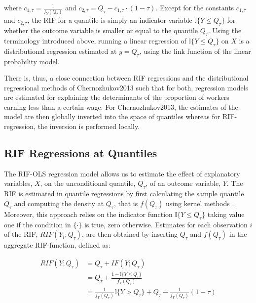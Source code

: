 where $c_{1,\tau} = \frac{1}{f_Y(Q_\tau)}$ and $c_{2,\tau} = Q_\tau - c_{1,\tau} \cdot (1 - \tau)$. Except for the constants $c_{1,\tau}$ and $c_{2,\tau}$, the RIF for a quantile is simply an indicator variable $\mathbb{I}\{Y \leq Q_\tau\}$ for whether the outcome variable is smaller or equal to the quantile $Q_\tau$. Using the terminology introduced above, running a linear regression of $\mathbb{I}\{Y \leq Q_\tau\}$ on $X$ is a distributional regression estimated at $y = Q_\tau$, using the link function of the linear probability model.

There is, thus, a close connection between RIF regressions and the distributional regressional methods of Chernozhukov2013 such that for both, regression models are estimated for explaining the determinants of the proportion of workers earning less than a certain wage. For Chernozhukov2013, the estimates of the model are then globally inverted into the space of quantiles whereas for RIF-regression, the inversion is performed locally.  

\subsection{RIF Regressions at Quantiles}

The RIF-OLS regression model allows us to estimate the effect of explanatory variables, $X$, on the unconditional quantile, $Q_{\tau}$, of an outcome variable, $Y$. The RIF is estimated in quantile regressions by first calculating the sample quantile $Q_{\tau}$ and computing the density at $Q_{\tau}$, that is $f(Q_{\tau})$ using kernel methods  \parencite{Firpo2009}. Moreover, this approach relies on the indicator function $\mathbb{I}\{Y \le Q_{\tau}\}$ taking value one if the condition in $\{\cdot\}$ is true, zero otherwise. Estimates for each observation $i$ of the RIF, $RIF(Y_{i}; Q_{\tau})$, are then obtained by inserting $Q_{\tau}$ and $f(Q_{\tau})$ in the aggregate RIF-function, defined as:

\begin{linenomath*}
	\begin{equation}
		\begin{split}
			RIF(Y; Q_{\tau}) &= Q_{\tau} + IF(Y; Q_{\tau}) \\
			&= Q_{\tau} + \frac{1 - \mathbb{I}\{Y \le Q_{\tau}\}}{f_{Y}(Q_{\tau})} \\
			&= \frac{1}{f_{Y}(Q_{\tau})}\mathbb{I}\{Y > Q_{\tau}\} + Q_{\tau} - \frac{1}{f_{Y}(Q_{\tau})}(1 - \tau)
		\end{split}
	\end{equation}
\end{linenomath*}

